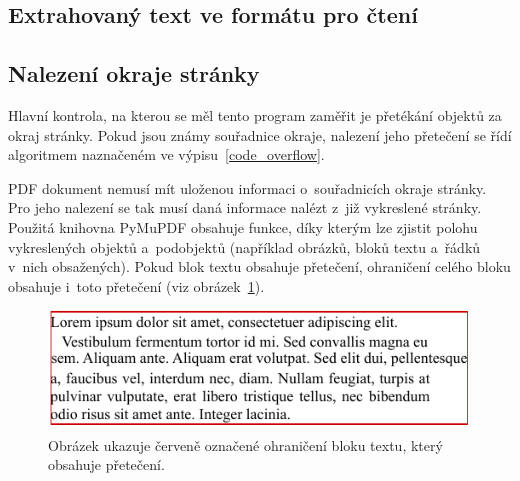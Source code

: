 \noindent\begin{minipage}{\linewidth}
    \hfill
    
\end{minipage}



\subsection*{Extrahovaný text ve formátu pro čtení}


\subsection*{Nalezení okraje stránky}
Hlavní kontrola, na kterou se měl tento program zaměřit je přetékání objektů za
okraj stránky. Pokud jsou známy souřadnice okraje, nalezení jeho přetečení
se řídí algoritmem naznačeném ve výpisu~\ref{code_overflow}.

\noindent\begin{minipage}{\linewidth}
    \hfill
    
\end{minipage}

PDF dokument nemusí mít uloženou informaci o~souřadnicích okraje stránky. Pro
jeho nalezení se tak musí daná informace nalézt z~již vykreslené stránky.
Použitá knihovna PyMuPDF obsahuje funkce, díky kterým lze zjistit polohu
vykreslených objektů a~podobjektů (například obrázků, bloků textu a~řádků v~nich
obsažených). Pokud blok textu obsahuje přetečení, ohraničení celého bloku
obsahuje i~toto přetečení (viz obrázek~\ref{pic_block_bbox}).

\begin{figure}[H]
    \label{pic_block_bbox}
    \centering
    \includegraphics[width=0.7\linewidth]{obrazky-figures/block_bbox.pdf}
    \caption{Obrázek ukazuje červeně označené ohraničení bloku textu, který obsahuje přetečení.}
\end{figure}

